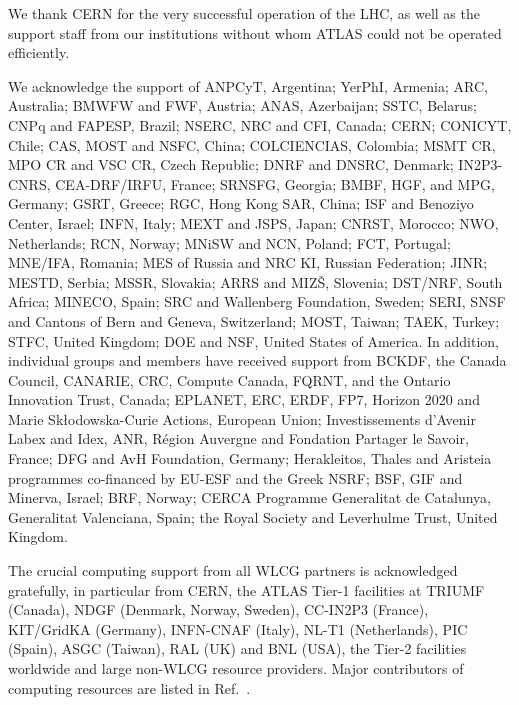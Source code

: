 
We thank CERN for the very successful operation of the LHC, as well as the
support staff from our institutions without whom ATLAS could not be
operated efficiently.

We acknowledge the support of ANPCyT, Argentina; YerPhI, Armenia; ARC, Australia; BMWFW and FWF, Austria; ANAS, Azerbaijan; SSTC, Belarus; CNPq and FAPESP, Brazil; NSERC, NRC and CFI, Canada; CERN; CONICYT, Chile; CAS, MOST and NSFC, China; COLCIENCIAS, Colombia; MSMT CR, MPO CR and VSC CR, Czech Republic; DNRF and DNSRC, Denmark; IN2P3-CNRS, CEA-DRF/IRFU, France; SRNSFG, Georgia; BMBF, HGF, and MPG, Germany; GSRT, Greece; RGC, Hong Kong SAR, China; ISF and Benoziyo Center, Israel; INFN, Italy; MEXT and JSPS, Japan; CNRST, Morocco; NWO, Netherlands; RCN, Norway; MNiSW and NCN, Poland; FCT, Portugal; MNE/IFA, Romania; MES of Russia and NRC KI, Russian Federation; JINR; MESTD, Serbia; MSSR, Slovakia; ARRS and MIZ\v{S}, Slovenia; DST/NRF, South Africa; MINECO, Spain; SRC and Wallenberg Foundation, Sweden; SERI, SNSF and Cantons of Bern and Geneva, Switzerland; MOST, Taiwan; TAEK, Turkey; STFC, United Kingdom; DOE and NSF, United States of America. In addition, individual groups and members have received support from BCKDF, the Canada Council, CANARIE, CRC, Compute Canada, FQRNT, and the Ontario Innovation Trust, Canada; EPLANET, ERC, ERDF, FP7, Horizon 2020 and Marie Sk{\l}odowska-Curie Actions, European Union; Investissements d'Avenir Labex and Idex, ANR, R{\'e}gion Auvergne and Fondation Partager le Savoir, France; DFG and AvH Foundation, Germany; Herakleitos, Thales and Aristeia programmes co-financed by EU-ESF and the Greek NSRF; BSF, GIF and Minerva, Israel; BRF, Norway; CERCA Programme Generalitat de Catalunya, Generalitat Valenciana, Spain; the Royal Society and Leverhulme Trust, United Kingdom.

The crucial computing support from all WLCG partners is acknowledged gratefully, in particular from CERN, the ATLAS Tier-1 facilities at TRIUMF (Canada), NDGF (Denmark, Norway, Sweden), CC-IN2P3 (France), KIT/GridKA (Germany), INFN-CNAF (Italy), NL-T1 (Netherlands), PIC (Spain), ASGC (Taiwan), RAL (UK) and BNL (USA), the Tier-2 facilities worldwide and large non-WLCG resource providers. Major contributors of computing resources are listed in Ref.~\cite{ATL-GEN-PUB-2016-002}.

